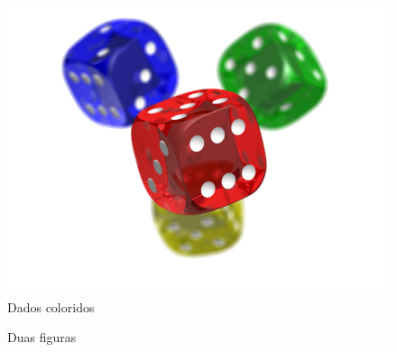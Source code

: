 \documentclass[12pt, a4paper]{article}
\begin{document}
		\lipsum[4]
		
		\begin{figure}[hbtp]
			\centering
			\includegraphics[width=0.5\paperwidth]{img_dados.png}
			\caption{Dados coloridos}
		\end{figure}
		
		\lipsum[5]
		
		\begin{figure}[h]
			\centering
			\quad\quad
			\caption{Duas figuras }
		\end{figure}
		
\end{document}
